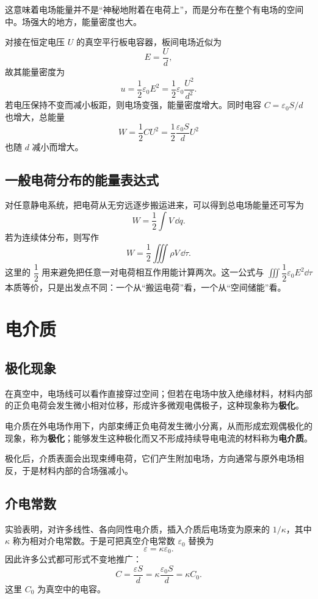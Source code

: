 这意味着电场能量并不是“神秘地附着在电荷上”，而是分布在整个有电场的空间中。场强大的地方，能量密度也大。

对接在恒定电压 $U$ 的真空平行板电容器，板间电场近似为
\[
E=\frac{U}{d},
\]
故其能量密度为
\[
u=\frac{1}{2}\varepsilon_0 E^2=\frac{1}{2}\varepsilon_0\frac{U^2}{d^2}.
\]
若电压保持不变而减小板距，则电场变强，能量密度增大。同时电容 $C=\varepsilon_0 S/d$ 也增大，总能量
\[
W=\frac{1}{2}CU^2=\frac{1}{2}\frac{\varepsilon_0 S}{d}U^2
\]
也随 $d$ 减小而增大。

\subsection{一般电荷分布的能量表达式}

对任意静电系统，把电荷从无穷远逐步搬运进来，可以得到总电场能量还可写为
\[
W=\frac{1}{2}\int V\,\dd q.
\]
若为连续体分布，则写作
\[
W=\frac{1}{2}\iiint \rho V\,\dd \tau.
\]
这里的 $\dfrac{1}{2}$ 用来避免把任意一对电荷相互作用能计算两次。这一公式与 $\iiint \dfrac{1}{2}\varepsilon_0 E^2\dd\tau$ 本质等价，只是出发点不同：一个从“搬运电荷”看，一个从“空间储能”看。

\section{电介质}

\subsection{极化现象}

在真空中，电场线可以看作直接穿过空间；但若在电场中放入绝缘材料，材料内部的正负电荷会发生微小相对位移，形成许多微观电偶极子，这种现象称为\textbf{极化}。

\begin{definition}
电介质在外电场作用下，内部束缚正负电荷发生微小分离，从而形成宏观偶极化的现象，称为\textbf{极化}；能够发生这种极化而又不形成持续导电电流的材料称为\textbf{电介质}。
\end{definition}

极化后，介质表面会出现束缚电荷，它们产生附加电场，方向通常与原外电场相反，于是材料内部的合场强减小。

\subsection{介电常数}

实验表明，对许多线性、各向同性电介质，插入介质后电场变为原来的 $1/\kappa$，其中 $\kappa$ 称为相对介电常数。于是可把真空介电常数 $\varepsilon_0$ 替换为
\[
\varepsilon=\kappa\varepsilon_0.
\]
因此许多公式都可形式不变地推广：
\[
C=\frac{\varepsilon S}{d}=\kappa\frac{\varepsilon_0 S}{d}=\kappa C_0.
\]
这里 $C_0$ 为真空中的电容。

